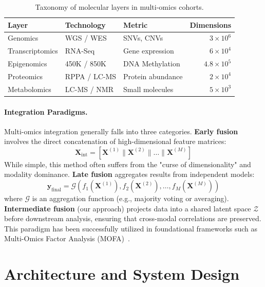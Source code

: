 \documentclass[conference,flushend]{iaria} %
\begin{document}
\begin{table}[H]
\caption{Taxonomy of molecular layers in multi-omics cohorts.}\label{tab:taxonomy}
\centering
\small
\begin{tabular}{l l l r}
\toprule
\textbf{Layer} & \textbf{Technology} & \textbf{Metric} & \textbf{Dimensions} \\
\midrule
Genomics        & WGS / WES     & SNVs, CNVs        & $3 \times 10^6$ \\
Transcriptomics & RNA-Seq       & Gene expression   & $6 \times 10^4$ \\
Epigenomics     & 450K / 850K   & DNA Methylation   & $4.8 \times 10^5$ \\
Proteomics      & RPPA / LC-MS  & Protein abundance & $2 \times 10^4$ \\
Metabolomics    & LC-MS / NMR   & Small molecules   & $5 \times 10^3$ \\
\bottomrule
\end{tabular}
\end{table}

\paragraph{Integration Paradigms.}
Multi-omics integration generally falls into three categories.
\textbf{Early fusion} involves the direct concatenation of high-dimensional feature matrices:
\begin{equation}
\mathbf{X}_{\text{int}} = \left[ \mathbf{X}^{(1)} \parallel \mathbf{X}^{(2)} \parallel \dots \parallel \mathbf{X}^{(M)} \right]
\end{equation}
While simple, this method often suffers from the "curse of dimensionality" and modality dominance.
\textbf{Late fusion} aggregates results from independent models:
\begin{equation}
\mathbf{y}_{\text{final}} = \mathcal{G}(f_1(\mathbf{X}^{(1)}), f_2(\mathbf{X}^{(2)}), \dots, f_M(\mathbf{X}^{(M)}))
\end{equation}
where $\mathcal{G}$ is an aggregation function (e.g., majority voting or averaging).
\textbf{Intermediate fusion} (our approach) projects data into a shared latent space $\mathcal{Z}$ before downstream analysis, ensuring that cross-modal correlations are preserved. This paradigm has been successfully utilized in foundational frameworks such as Multi-Omics Factor Analysis (MOFA)~\cite{argelaguet2018}.

\section{Architecture and System Design}
\end{document}
